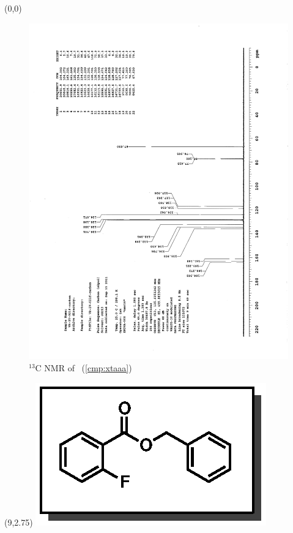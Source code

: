 \clearpage
\begin{textblock}{20}(0,0)
\begin{figure}[htb]
\caption{$^{13}$C NMR of  \CMPxtaaa\ (\ref{cmp:xtaaa})}
\includegraphics[scale=0.75, trim = 0mm 0mm 0mm 5mm,
clip]{chp_asymmetric/images/nmr/xtaaaC}
\vspace{-100pt}
\end{figure}
\end{textblock}
\begin{textblock}{1}(9,2.75)
\includegraphics[scale=0.8, angle=90]{chp_asymmetric/images/xtaaa}
\end{textblock}
